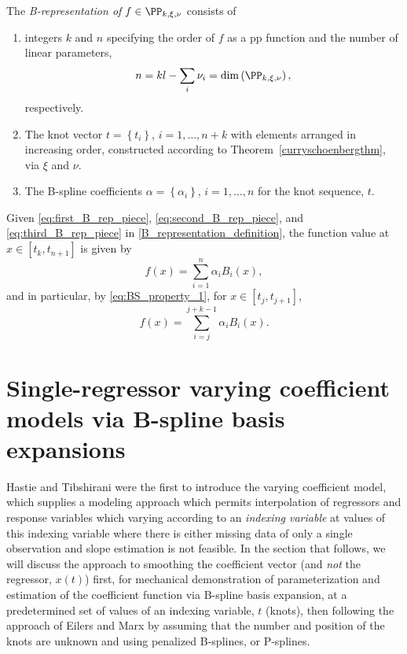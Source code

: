 \documentclass[12pt]{article}
\newenvironment{definition}[1][Definition]{\begin{trivlist}
\item[\hskip \labelsep {\bfseries #1}]}{\end{trivlist}}
\begin{document}
\begin{definition} \label{B_representation_definition}
The \emph{B-representation of } $f \in \PP_{k,\xi,\nu}$ consists of 
\begin{enumerate}
\item \label{eq:first_B_rep_piece} integers $k$ and $n$ specifying the order of $f$ as a pp function and the number of linear parameters, 
\[
n = kl - \sum_{i}\nu_i = \mbox{dim}\left(\PP_{k,\xi,\nu}\right),
\]
respectively. 
\item \label{eq:second_B_rep_piece}The knot vector $t = \left \{t_i \right\}$, $i=1,\dots, n+k$ with elements arranged in increasing order, constructed according to Theorem~\ref{curryschoenbergthm}, via $\xi$ and $\nu$.
\item \label{eq:third_B_rep_piece} The B-spline coefficients $\alpha=\left \{\alpha_i \right\}$, $i=1 ,\dots, n$ for the knot sequence, $t$.
\end{enumerate}
\end{definition}
\vspace{1pt}
Given \ref{eq:first_B_rep_piece}, \ref{eq:second_B_rep_piece}, and \ref{eq:third_B_rep_piece} in \ref{B_representation_definition}, the function value at $x\in \left[t_k, t_{n+1}\right]$ is given by 
\begin{equation*}
f\left(x\right) = \sum_{i=1}^n \alpha_i B_i\left(x\right),
\end{equation*}
and in particular, by \ref{eq:BS_property_1}, for $x\in \left[t_j, t_{j+1} \right]$,
\[
f\left(x\right) = \sum_{i=j}^{j+k-1} \alpha_i B_i\left(x\right).
\]





\section{Single-regressor varying coefficient models via B-spline basis expansions}

Hastie and Tibshirani were the first to introduce the varying coefficient model, which supplies a modeling approach which permits interpolation of regressors and response variables which varying according to an \emph{indexing variable} at values of this indexing variable where there is either missing data of only a single observation and slope estimation is not feasible. In the section that follows, we will discuss the approach to smoothing the coefficient vector (and \emph{not} the regressor, $x\left(t\right)$) first, for mechanical demonstration of parameterization and estimation of the coefficient function via B-spline basis expansion, at a predetermined set of values of an indexing variable, $t$ (knots), then following the approach of Eilers and Marx by assuming that the number and position of the knots are unknown and using penalized B-splines, or P-splines. 
\end{document}
